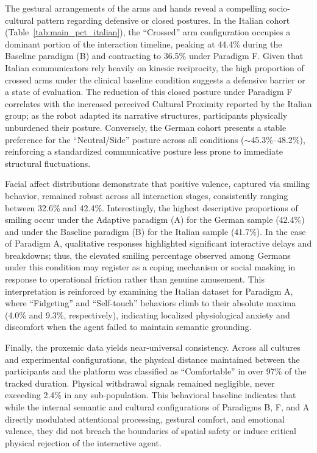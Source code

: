 The gestural arrangements of the arms and hands reveal a compelling socio-cultural pattern regarding defensive or closed postures. 
In the Italian cohort (Table~\ref{tab:main_pct_italian}), the ``Crossed'' arm configuration occupies a dominant portion of the interaction timeline, peaking at 44.4\% during the Baseline paradigm (B) and contracting to 36.5\% under Paradigm F. 
Given that Italian communicators rely heavily on kinesic reciprocity, the high proportion of crossed arms under the clinical baseline condition suggests a defensive barrier or a state of evaluation. 
The reduction of this closed posture under Paradigm F correlates with the increased perceived Cultural Proximity reported by the Italian group; as the robot adapted its narrative structures, participants physically unburdened their posture. 
Conversely, the German cohort presents a stable preference for the ``Neutral/Side'' posture across all conditions ($\sim$45.3\%--48.2\%), reinforcing a standardized communicative posture less prone to immediate structural fluctuations.

Facial affect distributions demonstrate that positive valence, captured via smiling behavior, remained robust across all interaction stages, consistently ranging between 32.6\% and 42.4\%.
Interestingly, the highest descriptive proportions of smiling occur under the Adaptive paradigm (A) for the German sample (42.4\%) and under the Baseline paradigm (B) for the Italian sample (41.7\%). 
In the case of Paradigm A, qualitative responses highlighted significant interactive delays and breakdowns; thus, the elevated smiling percentage observed among Germans under this condition may register as a coping mechanism or social masking in response to operational friction rather than genuine amusement. 
This interpretation is reinforced by examining the Italian dataset for Paradigm A, where ``Fidgeting'' and ``Self-touch'' behaviors climb to their absolute maxima (4.0\% and 9.3\%, respectively), indicating localized physiological anxiety and discomfort when the agent failed to maintain semantic grounding.

Finally, the proxemic data yields near-universal consistency. Across all cultures and experimental configurations, the physical distance maintained between the participants and the platform was classified as ``Comfortable'' in over 97\% of the tracked duration.
Physical withdrawal signals remained negligible, never exceeding 2.4\% in any sub-population. 
This behavioral baseline indicates that while the internal semantic and cultural configurations of Paradigms B, F, and A directly modulated attentional processing, gestural comfort, and emotional valence, they did not breach the boundaries of spatial safety or induce critical physical rejection of the interactive agent.

